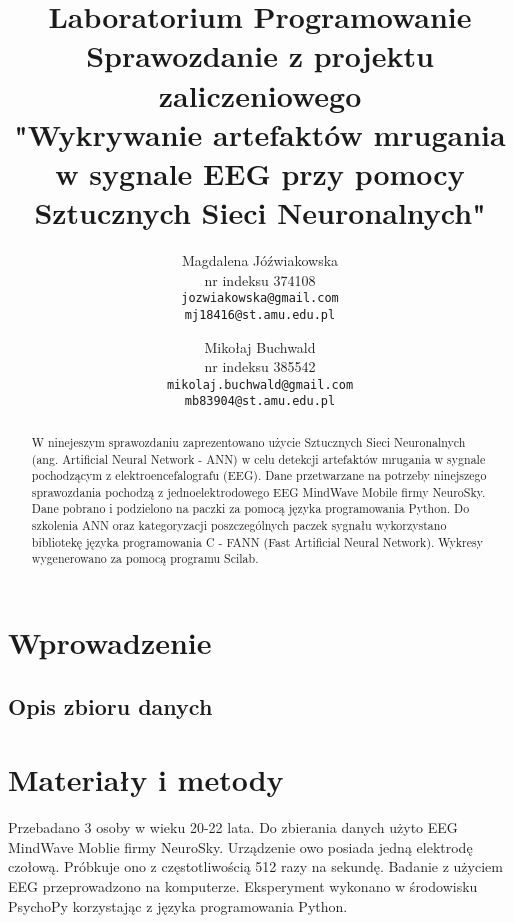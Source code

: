\documentclass{article}
\author{
Magdalena Jóźwiakowska\\nr indeksu 374108\\\texttt{jozwiakowska@gmail.com}\\\texttt{mj18416@st.amu.edu.pl}
\and
Mikołaj Buchwald\\nr indeksu 385542\\\texttt{mikolaj.buchwald@gmail.com}\\\texttt{mb83904@st.amu.edu.pl}
}
\title{Laboratorium Programowanie\\Sprawozdanie z projektu zaliczeniowego\\ 
"Wykrywanie artefaktów mrugania w sygnale EEG przy pomocy Sztucznych Sieci Neuronalnych"}
\begin{document}

\maketitle

\begin{abstract}
    W ninejeszym sprawozdaniu zaprezentowano użycie Sztucznych Sieci Neuronalnych (ang. Artificial Neural Network - ANN) w celu detekcji artefaktów mrugania w sygnale pochodzącym z elektroencefalografu (EEG). Dane przetwarzane na potrzeby ninejszego sprawozdania pochodzą z jednoelektrodowego EEG MindWave Mobile firmy NeuroSky. Dane pobrano i podzielono na paczki za pomocą języka programowania Python. Do szkolenia ANN oraz kategoryzacji poszczególnych paczek sygnału wykorzystano bibliotekę języka programowania C - FANN (Fast Artificial Neural Network). Wykresy wygenerowano za pomocą programu Scilab.
\end{abstract}

\newpage
\section{Wprowadzenie}
    
    \subsection{Opis zbioru danych}

\newpage

\section{Materiały i metody}
    Przebadano 3 osoby w wieku 20-22 lata. 
    Do zbierania danych użyto EEG MindWave Moblie firmy NeuroSky. Urządzenie owo posiada jedną elektrodę czołową. Próbkuje ono z częstotliwością 512 razy na sekundę.
    Badanie z użyciem EEG przeprowadzono na komputerze. Eksperyment wykonano w środowisku PsychoPy korzystając z języka programowania Python.
\end{document}
